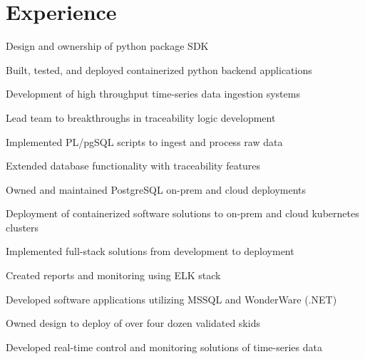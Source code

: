 \documentclass[]{bw-resume}
\begin{document}
\hfill
\begin{minipage}[t]{0.66\textwidth} 


\section{Experience}
\subsectionsep
{}
\subsectionsep
\begin{tightemize}
\item Design and ownership of python package SDK
\item Built, tested, and deployed containerized python backend applications
\item Development of high throughput time-series data ingestion systems
\item Lead team to breakthroughs in traceability logic development
\end{tightemize}
\sectionsep
{}
\begin{tightemize}
\item Implemented PL/pgSQL scripts to ingest and process raw data
\item Extended database functionality with traceability features
\item Owned and maintained PostgreSQL on-prem and cloud deployments
\end{tightemize}
\subsectionsep
{}
\begin{tightemize}
\item Deployment of containerized software solutions to on-prem and cloud kubernetes clusters
\item Implemented full-stack solutions from development to deployment
\item Created reports and monitoring using ELK stack
\end{tightemize}
\subsectionsep
{}
\begin{tightemize}
\item Developed software applications utilizing MSSQL and WonderWare (.NET)
\item Owned design to deploy of over four dozen validated skids
\item Developed real-time control and monitoring solutions of time-series data
\end{tightemize}
\sectionsep


\end{minipage}
\end{document}
